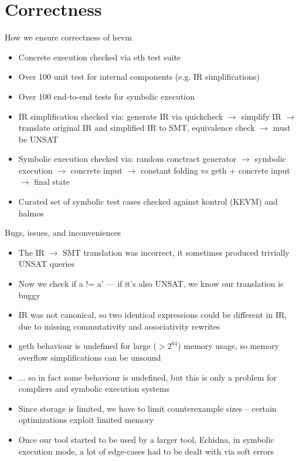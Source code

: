 \documentclass[aspectratio=169]{beamer}
\begin{document}
\section{Correctness}
\begin{frame}{How we ensure correctness of hevm}
\begin{itemize}
    \item Concrete execution checked via eth test suite
    \item Over 100 unit test for internal components (e.g. IR simplifications)
    \item Over 100 end-to-end tests for symbolic execution
    \item IR simplification checked via: generate IR via quickcheck $\rightarrow$ simplify IR $\rightarrow$ translate original IR and simplified IR to SMT, equivalence check $\rightarrow$ must be UNSAT
    \item Symbolic execution checked via: random conctract generator $\rightarrow$ symbolic execution $\rightarrow$ concrete input $\rightarrow$ constant folding vs geth + concrete input $\rightarrow$ final state
    \item Curated set of symbolic test cases checked against kontrol (KEVM) and halmos
\end{itemize}
\end{frame}

\begin{frame}{Bugs, issues, and inconveniences}
\begin{itemize}
    \item The IR $\rightarrow$ SMT translation was incorrect, it sometimes produced trivially UNSAT queries
    \item Now we check if a != a' --- if it's also UNSAT, we know our translation is buggy
    \item IR was not canonical, so two identical expressions could be different in IR, due to missing commutativity and associativity rewrites
    \item geth behaviour is undefined for large ($>2^{64}$) memory usage, so memory overflow simplifications can be unsound
    \item $\ldots$ so in fact some behaviour is undefined, but this is only a problem for compliers and symbolic execution systems
    \item Since storage is limited, we have to limit counterexample sizes -- certain optimizations exploit limited memory
    \item Once our tool started to be used by a larger tool, Echidna, in symbolic execution mode, a lot of edge-cases had to be dealt with via soft errors
\end{itemize}
\end{frame}
\end{document}
